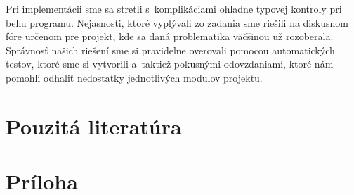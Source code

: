 \documentclass[a4paper, 11pt]{article}
\begin{document}
Pri implementácii sme sa stretli s~komplikáciami ohladne typovej kontroly pri behu programu. Nejasnosti, ktoré vyplývali zo zadania sme riešili na diskusnom fóre určenom pre projekt, kde sa daná problematika väčšinou už rozoberala.
Správnosť našich riešení sme si pravidelne overovali pomocou automatických testov, ktoré sme si vytvorili a~taktiež pokusnými odovzdaniami, ktoré nám pomohli odhaliť nedostatky jednotlivých modulov projektu.
\newpage
\section{Pouzitá literatúra}
\newpage
\section{Príloha}
\appendix
\end{document}
